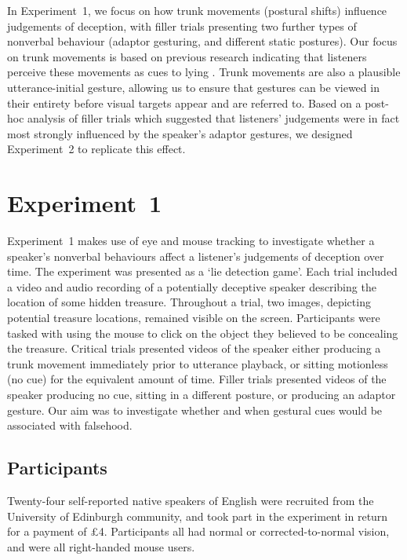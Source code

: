 \documentclass[a4paper,man,natbib]{apa6}
\let\oldtodo\todo
\renewcommand*{\todo}[1]{\oldtodo[fancyline]{#1}}
\begin{document}
In Experiment~1, we focus on how trunk movements (postural shifts) influence judgements of deception, with filler trials presenting two further types of nonverbal behaviour (adaptor gesturing, and different static postures).
Our focus on trunk movements is based on previous research indicating that listeners perceive these movements as cues to lying \citep{Vrij1996a, Zuckerman1981}.
Trunk movements are also a plausible  utterance-initial gesture, allowing us to ensure that gestures can be viewed in their entirety before visual targets appear and are referred to.  \todo{Jo please check this is accurate}
Based on a post-hoc analysis of filler trials which suggested that listeners' judgements were in fact most strongly influenced by the speaker's adaptor gestures, we designed Experiment~2 to replicate this effect.

\section{Experiment~1}
Experiment~1 makes use of eye  and mouse tracking to investigate whether a speaker's nonverbal behaviours affect a listener's judgements of deception over time. 
The experiment was presented as a `lie detection game'.
Each trial included a video and audio recording of a potentially deceptive speaker describing the location of some hidden treasure.
Throughout a trial, two images, depicting potential treasure locations, remained visible on the screen. 
Participants were tasked with using the mouse to click on the object they believed to be concealing the treasure.
Critical trials presented videos of the speaker either producing a trunk movement immediately prior to utterance playback, or sitting motionless (no cue) for the equivalent amount of time.
Filler trials presented videos of the speaker producing no cue, sitting in a different posture, or producing an adaptor gesture. 
Our aim was to investigate whether and when gestural cues would be associated with falsehood.

\subsection{Participants}
Twenty-four self-reported native speakers of English were recruited from the University of Edinburgh community, and took part in the experiment in return for a payment of \pounds{}4.
Participants all had normal or corrected-to-normal vision, and were all right-handed mouse users.
\end{document}
